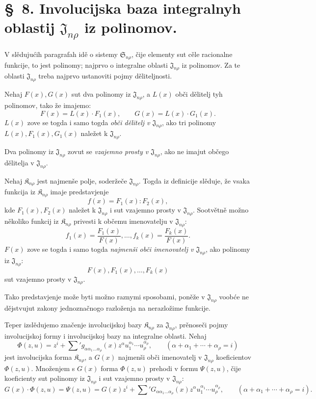 \documentclass[11pt]{article}
\providecommand{\Kfield}{\mathfrak{K}}
\providecommand{\Ssys}{\mathfrak{S}}
\providecommand{\Jdom}{\mathfrak{J}}
\begin{document}
\section*{\S\ 8. Involucijska baza integralnyh oblastij $\Jdom_{n\rho}$ iz polinomov.}

V slědujućih paragrafah idě o sistemy $\Ssys_{n\rho}$, čije elementy sut cěle racionalne funkcije, to jest polinomy; najprvo o integralne oblasti $\Jdom_{n\rho}$ iz polinomov. Za te oblasti $\Jdom_{n\rho}$ treba najprvo ustanoviti pojmy děliteljnosti.

Nehaj $F(x),G(x)$ sut dva polinomy iz $\Jdom_{n\rho}$, a $L(x)$ obči dělitelj tyh polinomov, tako že imajemo:
\[
  F(x)=L(x)\cdot F_1(x),\qquad G(x)=L(x)\cdot G_1(x).
\]
$L(x)$ zove se togda i samo togda {\itshape obči dělitelj v $\Jdom_{n\rho}$}, ako tri polinomy $L(x),F_1(x),G_1(x)$ naležet k $\Jdom_{n\rho}$.

Dva polinomy iz $\Jdom_{n\rho}$ zovut se {\itshape vzajemno prosty v $\Jdom_{n\rho}$}, ako ne imajut občego dělitelja v $\Jdom_{n\rho}$.

Nehaj $\Kfield_{n\rho}$ jest najmenše polje, soderžeče $\Jdom_{n\rho}$. Togda iz definicije slěduje, že vsaka funkcija iz $\Kfield_{n\rho}$ imaje predstavjenje
\[
  f(x)=F_1(x):F_2(x),
\]
kde $F_1(x),F_2(x)$ naležet k $\Jdom_{n\rho}$ i sut vzajemno prosty v $\Jdom_{n\rho}$. Sootvětně možno několiko funkcij iz $\Kfield_{n\rho}$ privesti k občemu imenovatelju v $\Jdom_{n\rho}$:
\[
  f_1(x)=\frac{F_1(x)}{F(x)},\ldots,
  f_k(x)=\frac{F_k(x)}{F(x)}.
\]
$F(x)$ zove se togda i samo togda {\itshape najmenši obči imenovatelj v $\Jdom_{n\rho}$}, ako polinomy iz $\Jdom_{n\rho}$:
\[
  F(x),F_1(x),\ldots,F_k(x)
\]
sut vzajemno prosty v $\Jdom_{n\rho}$.

Tako predstavjenje može byti možno raznymi sposobami, poněže v $\Jdom_{n\rho}$ voobće ne dějstvujut zakony jednoznačnogo razloženja na nerazložime funkcije.

Teper izslědujemo značenje involucijskoj bazy $\Kfield_{n\rho}$ za $\Jdom_{n\rho}$, prěnoseči pojmy involucijskoj formy i involucijskoj bazy na integralne oblasti. Nehaj
\[
  \Phi(z,u)=z^i+\sum{}' g_{\alpha\alpha_1\ldots\alpha_\rho}(x)
  z^\alpha u_1^{\alpha_1}\cdots u_\rho^{\alpha_\rho},
  \qquad
  (\alpha+\alpha_1+\cdots+\alpha_\rho=i)
\]
jest involucijska forma $\Kfield_{n\rho}$, a $G(x)$ najmenši obči imenovatelj v $\Jdom_{n\rho}$ koeficientov $\Phi(z,u)$. Množenjem s $G(x)$ forma $\Phi(z,u)$ prehodi v formu $\Psi(z,u)$, čije koeficienty sut polinomy iz $\Jdom_{n\rho}$ i sut vzajemno prosty v $\Jdom_{n\rho}$:
\[
  G(x)\cdot\Phi(z,u)=\Psi(z,u)
  =G(x)z^i+
  \sum{}' G_{\alpha\alpha_1\ldots\alpha_\rho}(x)
  z^\alpha u_1^{\alpha_1}\cdots u_\rho^{\alpha_\rho},
  \qquad
  (\alpha+\alpha_1+\cdots+\alpha_\rho=i).
\]
\end{document}

